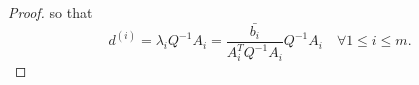 \begin{proof}
so that 
\[
d^{(i)} = \lambda_i Q^{-1}A_i = \frac {\bar{b_i}}{A_i^T  Q^{-1}A_i}  Q^{-1}A_i \quad \forall 1\le i\le m.
\]


\end{proof}
